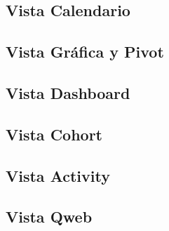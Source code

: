 \documentclass[letterpaper,10pt,spanish]{sphinxmanual}
\begin{document}
\subsection{Vista Calendario}
\label{\detokenize{tecnico/vistas/tipos-de-vistas/vista-calendario:vista-calendario}}\label{\detokenize{tecnico/vistas/tipos-de-vistas/vista-calendario:id1}}\label{\detokenize{tecnico/vistas/tipos-de-vistas/vista-calendario::doc}}

\subsection{Vista Gráfica y Pivot}
\label{\detokenize{tecnico/vistas/tipos-de-vistas/vista-grafica-y-pivot:vista-grafica-y-pivot}}\label{\detokenize{tecnico/vistas/tipos-de-vistas/vista-grafica-y-pivot:id1}}\label{\detokenize{tecnico/vistas/tipos-de-vistas/vista-grafica-y-pivot::doc}}

\subsection{Vista Dashboard}
\label{\detokenize{tecnico/vistas/tipos-de-vistas/vista-dashboard:vista-dashboard}}\label{\detokenize{tecnico/vistas/tipos-de-vistas/vista-dashboard:id1}}\label{\detokenize{tecnico/vistas/tipos-de-vistas/vista-dashboard::doc}}

\subsection{Vista Cohort}
\label{\detokenize{tecnico/vistas/tipos-de-vistas/vista-cohort:vista-cohort}}\label{\detokenize{tecnico/vistas/tipos-de-vistas/vista-cohort:id1}}\label{\detokenize{tecnico/vistas/tipos-de-vistas/vista-cohort::doc}}

\subsection{Vista Activity}
\label{\detokenize{tecnico/vistas/tipos-de-vistas/vista-activity:vista-activity}}\label{\detokenize{tecnico/vistas/tipos-de-vistas/vista-activity:id1}}\label{\detokenize{tecnico/vistas/tipos-de-vistas/vista-activity::doc}}

\subsection{Vista Qweb}
\label{\detokenize{tecnico/vistas/tipos-de-vistas/vista-qweb:vista-qweb}}\label{\detokenize{tecnico/vistas/tipos-de-vistas/vista-qweb:id1}}\label{\detokenize{tecnico/vistas/tipos-de-vistas/vista-qweb::doc}}
\end{document}
